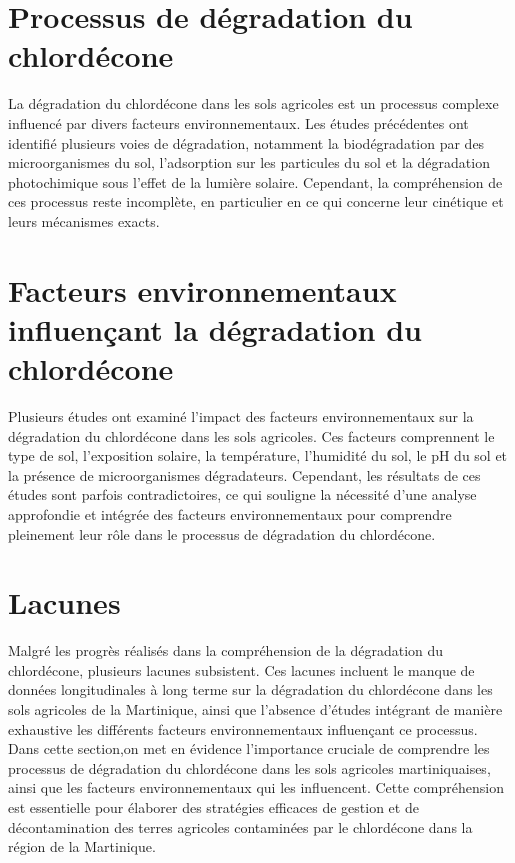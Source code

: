 \documentclass{report}
\begin{document}
\section{Processus de dégradation du chlordécone}


La dégradation du chlordécone dans les sols agricoles est un processus complexe influencé par divers facteurs environnementaux. Les études précédentes ont identifié plusieurs voies de dégradation, notamment la biodégradation par des microorganismes du sol, l'adsorption sur les particules du sol et la dégradation photochimique sous l'effet de la lumière solaire. Cependant, la compréhension de ces processus reste incomplète, en particulier en ce qui concerne leur cinétique et leurs mécanismes exacts.

\section{Facteurs environnementaux influençant la dégradation du chlordécone}


Plusieurs études ont examiné l'impact des facteurs environnementaux sur la dégradation du chlordécone dans les sols agricoles. Ces facteurs comprennent le type de sol, l'exposition solaire, la température, l'humidité du sol, le pH du sol et la présence de microorganismes dégradateurs. Cependant, les résultats de ces études sont parfois contradictoires, ce qui souligne la nécessité d'une analyse approfondie et intégrée des facteurs environnementaux pour comprendre pleinement leur rôle dans le processus de dégradation du chlordécone.

\section{Lacunes}


Malgré les progrès réalisés dans la compréhension de la dégradation du chlordécone, plusieurs lacunes subsistent. Ces lacunes incluent le manque de données longitudinales à long terme sur la dégradation du chlordécone dans les sols agricoles de la Martinique, ainsi que l'absence d'études intégrant de manière exhaustive les différents facteurs environnementaux influençant ce processus.
\\

Dans cette section,on met en évidence l'importance cruciale de comprendre les processus de dégradation du chlordécone dans les sols agricoles martiniquaises, ainsi que les facteurs environnementaux qui les influencent. Cette compréhension est essentielle pour élaborer des stratégies efficaces de gestion et de décontamination des terres agricoles contaminées par le chlordécone dans la région de la Martinique.
\end{document}
